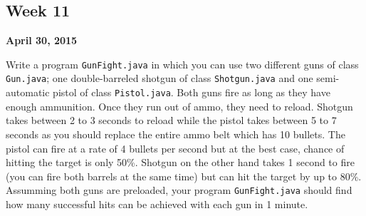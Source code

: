 \documentclass[12pt,letterpaper,twoside]{article}
\begin{document}


\subsection*{Week 11}
\hfill \textbf{April 30, 2015}

Write a program \texttt{GunFight.java} in which you can use two different guns of class \texttt{Gun.java}; one double-barreled shotgun of class \texttt{Shotgun.java} and one semi-automatic pistol of class \texttt{Pistol.java}.
Both guns fire as long as they have enough ammunition.
Once they run out of ammo, they need to reload.
Shotgun takes between 2 to 3 seconds to reload while the pistol takes between 5 to 7 seconds as you should replace the entire ammo belt which has 10 bullets.
The pistol can fire at a rate of 4 bullets per second but at the best case, chance of hitting the target is only 50\%.
Shotgun on the other hand takes 1 second to fire (you can fire both barrels at the same time) but can hit the target by up to 80\%.
Assumming both guns are preloaded, your program \texttt{GunFight.java} should find how many successful hits can be achieved with each gun in 1 minute.
\end{document}
